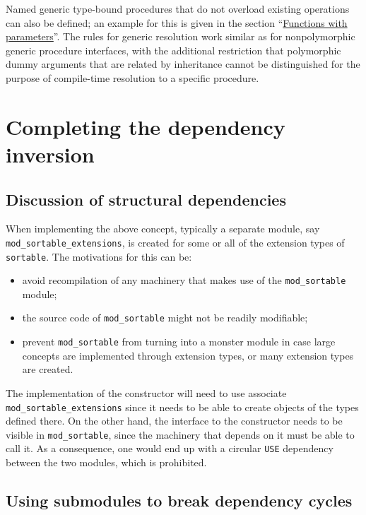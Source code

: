 \documentclass[
  paper=a4,
  ,captions=tableheading
]{scrartcl}
\providecommand{\tightlist}{%
  \setlength{\itemsep}{0pt}\setlength{\parskip}{0pt}}
\begin{document}
Named generic type-bound procedures that do not overload existing
operations can also be defined; an example for this is given in the
section ``\hyperref[sec:functions_with_parameters]{Functions with
parameters}''. The rules for generic resolution work similar as for
nonpolymorphic generic procedure interfaces, with the additional
restriction that polymorphic dummy arguments that are related by
inheritance cannot be distinguished for the purpose of compile-time
resolution to a specific procedure.

\section{Completing the dependency
inversion}\label{completing-the-dependency-inversion}

\subsection{Discussion of structural
dependencies}\label{discussion-of-structural-dependencies}

When implementing the above concept, typically a separate module, say
\texttt{mod\_sortable\_extensions}, is created for some or all of the
extension types of \texttt{sortable}. The motivations for this can be:

\begin{itemize}
\tightlist
\item
  avoid recompilation of any machinery that makes use of the
  \texttt{mod\_sortable} module;
\item
  the source code of \texttt{mod\_sortable} might not be readily
  modifiable;
\item
  prevent \texttt{mod\_sortable} from turning into a monster module in
  case large concepts are implemented through extension types, or many
  extension types are created.
\end{itemize}

The implementation of the constructor will need to use associate
\texttt{mod\_sortable\_extensions} since it needs to be able to create
objects of the types defined there. On the other hand, the interface to
the constructor needs to be visible in \texttt{mod\_sortable}, since the
machinery that depends on it must be able to call it. As a consequence,
one would end up with a circular \texttt{USE} dependency between the two
modules, which is prohibited.

\subsection{Using submodules to break dependency
cycles}\label{using-submodules-to-break-dependency-cycles}
\end{document}

